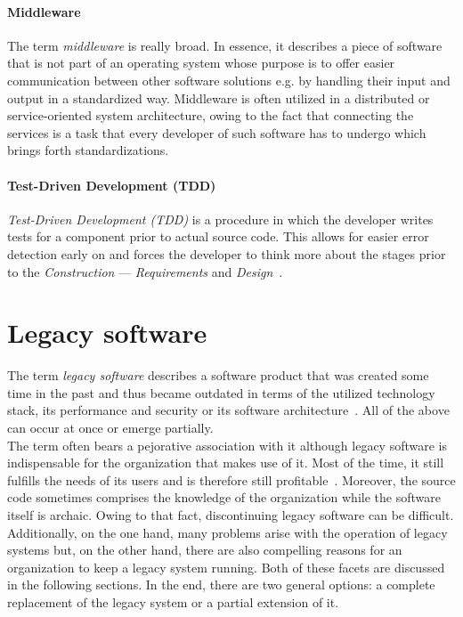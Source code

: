 \documentclass[12pt,a4paper]{report}
\begin{document}
\paragraph{Middleware}
The term \textit{middleware} is really broad. In essence, it describes a piece
of software that is not part of an operating system whose purpose is to
offer easier communication between other software solutions e.g. by handling
their input and output in a standardized way.
Middleware is often utilized in a distributed or service-oriented system architecture,
owing to the fact that connecting the services is a task that every developer
of such software has to undergo which brings forth standardizations.

\paragraph{Test-Driven Development (TDD)}
\textit{Test-Driven Development (TDD)} is a procedure in which the developer
writes tests for a component prior to actual source code.
This allows for easier error detection early on and forces the developer to think
more about the stages prior to the \textit{Construction} ---
\textit{Requirements} and \textit{Design}~\cite{swebok}.


\section{Legacy software} \label{sect:legacy-software}

The term \textit{legacy software} describes a software product that was created
some time in the past and thus became outdated in terms of the utilized technology
stack, its performance and security or its software architecture~\cite{seacord-modernizing-legacy}.
All of the above can occur at once or emerge partially.\\
The term often bears a pejorative association with it although legacy software
is indispensable for the organization that makes use of it. Most of the time, it
still fulfills the needs of its users and is therefore still profitable~\cite{bennett-coping-legacy}.
Moreover, the source code sometimes comprises the knowledge of the organization while
the software itself is archaic. Owing to that fact, discontinuing legacy software can be difficult.
Additionally, on the one hand, many problems arise with the operation of legacy systems but,
on the other hand, there are also compelling reasons for an organization
to keep a legacy system running. Both of these facets are discussed in the following sections.
In the end, there are two general options: a complete replacement of the legacy system or
a partial extension of it.
\end{document}
